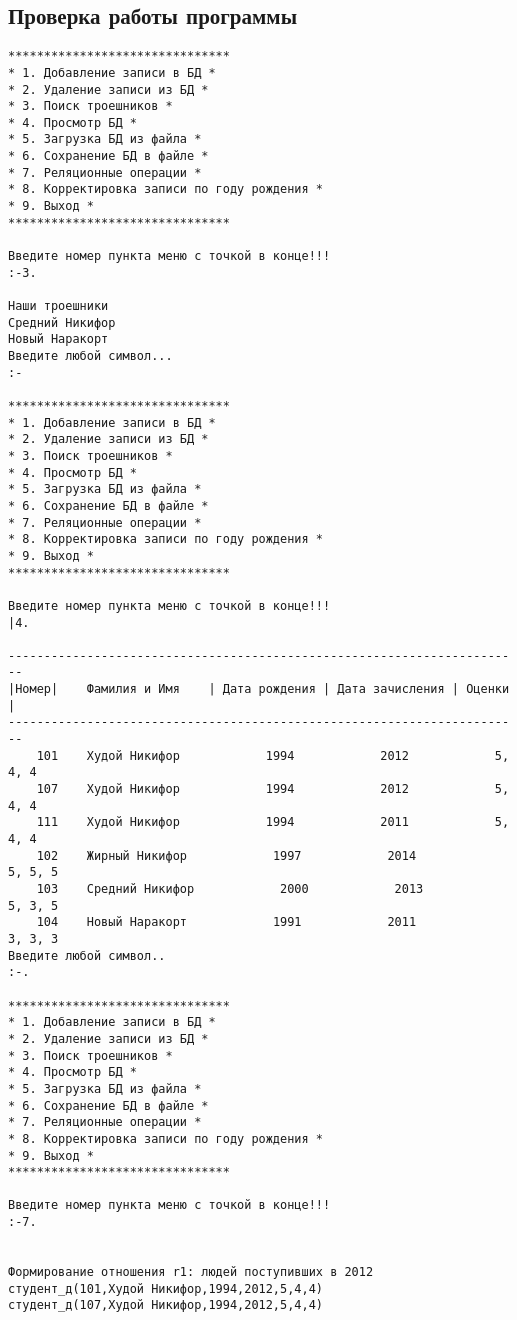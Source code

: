 \documentclass[a4paper,14pt]{extarticle}
\begin{document}
\subsection{Проверка работы программы}
\begin{lstlisting}
*******************************
* 1. Добавление записи в БД *
* 2. Удаление записи из БД *
* 3. Поиск троешников *
* 4. Просмотр БД *
* 5. Загрузка БД из файла *
* 6. Сохранение БД в файле *
* 7. Реляционные операции *
* 8. Корректировка записи по году рождения *
* 9. Выход *
*******************************

Введите номер пункта меню с точкой в конце!!!
:-3.

Наши троешники
Средний Никифор    
Новый Наракорт    
Введите любой символ...
:-

*******************************
* 1. Добавление записи в БД *
* 2. Удаление записи из БД *
* 3. Поиск троешников *
* 4. Просмотр БД *
* 5. Загрузка БД из файла *
* 6. Сохранение БД в файле *
* 7. Реляционные операции *
* 8. Корректировка записи по году рождения *
* 9. Выход *
*******************************

Введите номер пункта меню с точкой в конце!!!
|4.

------------------------------------------------------------------------
|Номер|    Фамилия и Имя    | Дата рождения | Дата зачисления | Оценки |
------------------------------------------------------------------------
    101    Худой Никифор            1994            2012            5, 4, 4
    107    Худой Никифор            1994            2012            5, 4, 4
    111    Худой Никифор            1994            2011            5, 4, 4
    102    Жирный Никифор            1997            2014            5, 5, 5
    103    Средний Никифор            2000            2013            5, 3, 5
    104    Новый Наракорт            1991            2011            3, 3, 3
Введите любой символ..
:-.

*******************************
* 1. Добавление записи в БД *
* 2. Удаление записи из БД *
* 3. Поиск троешников *
* 4. Просмотр БД *
* 5. Загрузка БД из файла *
* 6. Сохранение БД в файле *
* 7. Реляционные операции *
* 8. Корректировка записи по году рождения *
* 9. Выход *
*******************************

Введите номер пункта меню с точкой в конце!!!
:-7.


Формирование отношения r1: людей поступивших в 2012 
студент_д(101,Худой Никифор,1994,2012,5,4,4)
студент_д(107,Худой Никифор,1994,2012,5,4,4)


\end{lstlisting}
\end{document}
